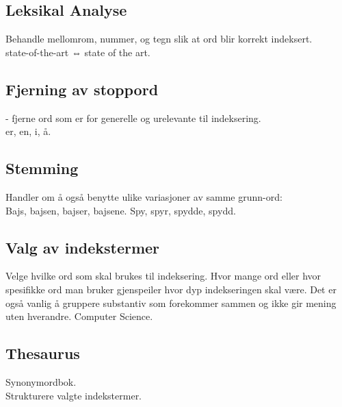 \documentclass[a4paper, 10pt]{article}
\begin{document}
\subsection{Leksikal Analyse} 
Behandle mellomrom, nummer, og tegn slik at ord blir korrekt indeksert.\\
state-of-the-art ⇔ state of the art.

\subsection{Fjerning av stoppord} - fjerne ord som er for generelle og urelevante til indeksering. \\
er, en, i, å.

\subsection{Stemming}
Handler om å også benytte ulike variasjoner av samme grunn-ord:\\
Bajs, bajsen, bajser, bajsene. Spy, spyr, spydde, spydd.

\subsection{Valg av indekstermer}
Velge hvilke ord som skal brukes til indeksering. Hvor mange ord eller hvor spesifikke ord man bruker gjenspeiler hvor dyp indekseringen skal være. Det er også vanlig å gruppere substantiv som forekommer sammen og ikke gir mening uten hverandre.
Computer Science.

\subsection{Thesaurus}
Synonymordbok.\\
Strukturere valgte indekstermer.
\end{document}
